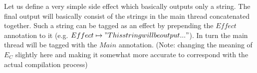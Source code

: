 \documentclass[11pt]{article}
\begin{document}
Let us define a very simple side effect which basically outputs only a string. The final output will basically consist of the strings in the main thread concatenated together.
Such a string can be tagged as an effect by prepending the $Effect$ annotation to it (e.g. $Effect \mapsto "This string will be output..."$).
In turn the main thread will be tagged with the $Main$ annotation.
(Note: changing the meaning of $E_{C}$ slightly here and making it somewhat more accurate to correspond with the actual compilation process)

\end{document}

